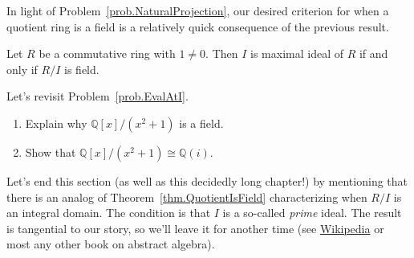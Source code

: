 In light of Problem~\ref{prob.NaturalProjection}, our desired criterion for when a quotient ring is  a field is a relatively quick consequence of the previous result. 

\begin{theorem}\label{thm.QuotientIsField}
Let $R$ be a commutative ring with $1\neq0$. Then $I$ is maximal ideal of $R$ if and only if $R/I$ is field.
\end{theorem}

\begin{problem}\label{prob.EvalAtI-Take2}
Let's revisit Problem~\ref{prob.EvalAtI}.
\begin{enumerate}
\item Explain why $\mathbb{Q}[x]/(x^2+1)$ is a field.
\item Show that $\mathbb{Q}[x]/(x^2+1) \cong \mathbb{Q}(i)$.
\end{enumerate}
\end{problem}

Let's end this section (as well as this decidedly long chapter!) by mentioning that there is an analog of Theorem~\ref{thm.QuotientIsField} characterizing when $R/I$ is an integral domain. The condition is that $I$ is a so-called \textit{prime} ideal. The result is tangential to our story, so we'll leave it for another time (see \href{https://en.wikipedia.org/wiki/Prime_ideal#Connection_to_maximality}{Wikipedia} or most any other book on abstract algebra).




